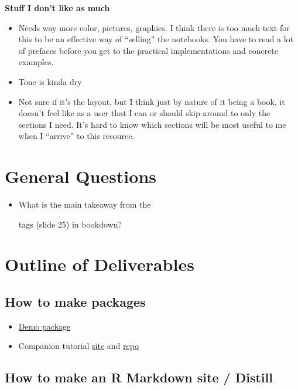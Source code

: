 \documentclass[]{book}
\providecommand{\tightlist}{%
  \setlength{\itemsep}{0pt}\setlength{\parskip}{0pt}}
\begin{document}
\textbf{Stuff I don't like as much}

\begin{itemize}
\tightlist
\item
  Needs way more color, pictures, graphics. I think there is too much text for this to be an effective way of ``selling'' the notebooks. You have to read a lot of prefaces before you get to the practical implementations and concrete examples.
\item
  Tone is kinda dry
\item
  Not sure if it's the layout, but I think just by nature of it being a book, it doesn't feel like as a user that I can or should skip around to only the sections I need. It's hard to know which sections will be most useful to me when I ``arrive'' to this resource.
\end{itemize}

\hypertarget{general-questions}{%
\chapter{General Questions}\label{general-questions}}

\begin{itemize}
\tightlist
\item
  What is the main takeaway from the

  tags (slide 25) in bookdown?
\end{itemize}

\hypertarget{outline-of-deliverables}{%
\chapter{Outline of Deliverables}\label{outline-of-deliverables}}

\hypertarget{how-to-make-packages}{%
\section{How to make packages}\label{how-to-make-packages}}

\begin{itemize}
\tightlist
\item
  \href{https://github.com/rstudio4edu/testpackage}{Demo package}
\item
  Companion tutorial \href{https://rstudio4edu.github.io/firstclasspackage/}{site} and \href{https://github.com/rstudio4edu/firstclasspackage}{repo}
\end{itemize}

\hypertarget{how-to-make-an-r-markdown-site-distill}{%
\section{How to make an R Markdown site / Distill}\label{how-to-make-an-r-markdown-site-distill}}
\end{document}
